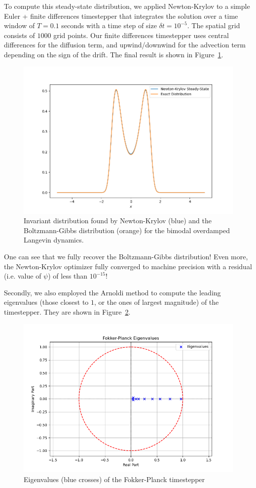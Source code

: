 \documentclass{article}
\begin{document}
To compute this steady-state distribution, we applied Newton-Krylov to a simple Euler + finite differences timestepper that integrates the solution over a time window of $T = 0.1$ seconds with a time step of size $\delta t = 10^{-5}$. The spatial grid consists of $1000$ grid points. Our finite differences timestepper uses central differences for the diffusion term, and upwind/downwind for the advection term depending on the sign of the drift. The final result is shown in Figure~\ref{fig:bimodal}.
\begin{figure}[ht]
    \centering
    \includegraphics[width=0.8\linewidth]{figures/Bimodal Steady State.png}
    \caption{Invariant distribution found by Newton-Krylov (blue) and the Boltzmann-Gibbs distribution (orange) for the bimodal overdamped Langevin dynamics.}
    \label{fig:bimodal}
\end{figure}
One can see that we fully recover the Boltzmann-Gibbs distribution! Even more, the Newton-Krylov optimizer fully converged to machine precision with a residual (i.e. value of $\psi$) of less than $10^{-15}$!

Secondly, we also employed the Arnoldi method to compute the leading eigenvalues (those closest to $1$, or the ones of largest magnitude) of the timestepper. They are shown in Figure~\ref{fig:bimodal_eigenvalues}.
\begin{figure}[ht]
    \centering
    \includegraphics[width=0.8\linewidth]{figures/Bimodal Eigenvalues.png}
    \caption{Eigenvalues (blue crosses) of the Fokker-Planck timestepper}
    \label{fig:bimodal_eigenvalues}
\end{figure}
\end{document}
